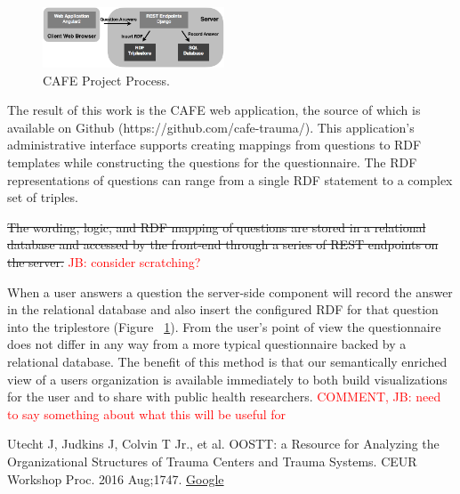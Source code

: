 \documentclass{amia}
\begin{document}
\begin{figure}
  \begin{center}
    \includegraphics[width=0.48\textwidth]{pics/cafe_process2.png}
  \end{center}
  \caption{CAFE Project Process.}
  \label{cafe_process}
\end{figure}

The result of this work is the CAFE web application, the source of which is available on Github (https://github.com/cafe-trauma/). 
This application's administrative interface supports creating mappings from questions to RDF templates while constructing the questions for the questionnaire. The RDF representations of questions can range from a single RDF statement to a complex set of triples.

\sout {The wording, logic, and RDF mapping of questions are stored in a relational database and accessed by the front-end through a series of REST endpoints on the server.}
\textcolor{red}{JB: consider scratching?}

When a user answers a question the server-side component will record the answer in the relational database and also insert the configured RDF for that question into the triplestore (Figure ~\ref{cafe_process}).
From the user's point of view the questionnaire does not differ in any way from a more typical questionnaire backed by a relational database.
The benefit of this method is that our semantically enriched view of a users organization is available immediately to both build visualizations for the user and to share with public health researchers.
\textcolor{red}{COMMENT, JB: need to say something about what this will be useful for}


\makeatletter
\renewcommand{\@biblabel}[1]{\hfill #1.}
\makeatother


\begin{thebibliography}{1}
\setlength\itemsep{-0.1em}

Utecht J, Judkins J, Colvin T Jr., et al. OOSTT: a Resource for Analyzing the Organizational Structures of Trauma Centers and Trauma Systems. CEUR Workshop Proc. 2016 Aug;1747. \href{http://google.com}{Google}

\end{thebibliography}
\end{document}

